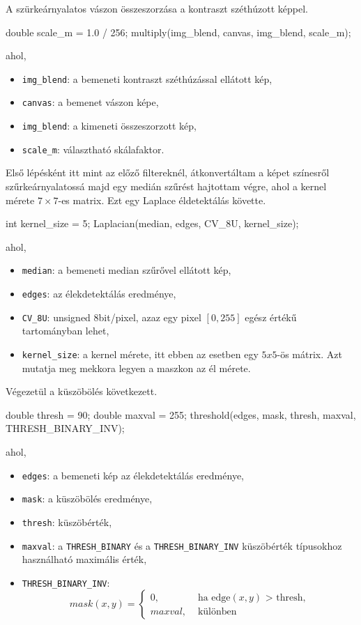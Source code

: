 A szürkeárnyalatos vászon összeszorzása a kontraszt széthúzott képpel.
\begin{cpp}
double scale_m = 1.0 / 256;
multiply(img_blend, canvas, img_blend, scale_m);
\end{cpp}
ahol,
\begin{itemize}
    \item \texttt{img\_blend}: a bemeneti kontraszt széthúzással ellátott kép,
    \item \texttt{canvas}: a bemenet vászon képe,
    \item \texttt{img\_blend}: a kimeneti összeszorzott kép,
    \item \texttt{scale\_m}: választható skálafaktor.
\end{itemize}


Első lépésként itt mint az előző filtereknél, átkonvertáltam a képet színesről szűrkeárnyalatossá majd egy medián szűrést hajtottam végre, ahol a kernel mérete $7 \times 7$-es matrix.
Ezt egy Laplace éldetektálás követte.
\begin{cpp}
int kernel_size = 5;  
Laplacian(median, edges, CV_8U, kernel_size);
\end{cpp}
ahol,
\begin{itemize}
    \item \texttt{median}: a bemeneti median szűrővel ellátott kép,
    \item \texttt{edges}: az élekdetektálás eredménye,
    \item \texttt{CV\_8U}: unsigned 8bit/pixel, azaz egy pixel $[0, 255]$ egész értékű tartományban lehet,
    \item \texttt{kernel\_size}: a kernel mérete, itt ebben az esetben egy $5 x 5$-ös mátrix. Azt mutatja meg mekkora legyen a maszkon az él mérete.
\end{itemize}
Végezetül a küszöbölés következett.
\begin{cpp}
double thresh = 90;
double maxval = 255;
threshold(edges, mask, thresh, maxval, THRESH_BINARY_INV);
\end{cpp}
ahol,
\begin{itemize}
    \item \texttt{edges}: a bemeneti kép az élekdetektálás eredménye,
    \item \texttt{mask}: a küszöbölés eredménye,
    \item \texttt{thresh}: küszöbérték,
    \item \texttt{maxval}: a \texttt{THRESH\_BINARY} és a \texttt{THRESH\_BINARY\_INV} küszöbérték típusokhoz használható maximális érték,
    \item \texttt{THRESH\_BINARY\_INV}:
$$
mask(x, y) = \left\{
\begin{array}{ll}
0, & \mbox{ ha edge$(x, y)$ > thresh,}\\
maxval, & \mbox{ különben}
\end{array}
\right.
$$
\end{itemize}

